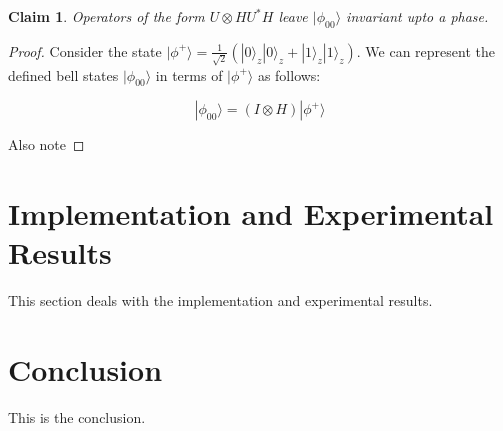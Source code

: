 \documentclass[conference]{IEEEtran}
\newtheorem{claim}{Claim}
\begin{document}
\begin{claim}
    Operators of the form $U \otimes HU^*H$ leave $| \phi_{00} \rangle$ invariant upto a phase.
\end{claim}

\begin{proof}
    Consider the state $| \phi^+ \rangle = \frac{1}{\sqrt{2}} (|0\rangle_z |0\rangle_z + |1\rangle_z |1\rangle_z)$. We can represent the defined bell states $| \phi_{00} \rangle$ in terms of $| \phi^+ \rangle$ as follows:

    \begin{equation}
        | \phi_{00} \rangle = (I \otimes H) | \phi^+ \rangle
    \end{equation}

    Also note 
\end{proof}

\section{Implementation and Experimental Results}
This section deals with the implementation and experimental results.

\section{Conclusion}
This is the conclusion.



\end{document}
